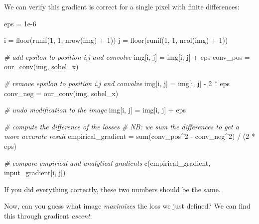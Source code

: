\documentclass[
  a4paper,
]{article}
\newenvironment{Shaded}{\begin{snugshade}}{\end{snugshade}}
\newcommand{\CommentTok}[1]{\textcolor[rgb]{0.56,0.35,0.01}{\textit{#1}}}
\newcommand{\DecValTok}[1]{\textcolor[rgb]{0.00,0.00,0.81}{#1}}
\newcommand{\FloatTok}[1]{\textcolor[rgb]{0.00,0.00,0.81}{#1}}
\newcommand{\FunctionTok}[1]{\textcolor[rgb]{0.00,0.00,0.00}{#1}}
\newcommand{\NormalTok}[1]{#1}
\newcommand{\OtherTok}[1]{\textcolor[rgb]{0.56,0.35,0.01}{#1}}
\newcommand{\SpecialCharTok}[1]{\textcolor[rgb]{0.00,0.00,0.00}{#1}}
\begin{document}
We can verify this gradient is correct for a single pixel with finite
differences:

\begin{Shaded}
\begin{Highlighting}[]
\NormalTok{eps }\OtherTok{=} \FloatTok{1e{-}6}

\NormalTok{i }\OtherTok{=} \FunctionTok{floor}\NormalTok{(}\FunctionTok{runif}\NormalTok{(}\DecValTok{1}\NormalTok{, }\DecValTok{1}\NormalTok{, }\FunctionTok{nrow}\NormalTok{(img) }\SpecialCharTok{+} \DecValTok{1}\NormalTok{))}
\NormalTok{j }\OtherTok{=} \FunctionTok{floor}\NormalTok{(}\FunctionTok{runif}\NormalTok{(}\DecValTok{1}\NormalTok{, }\DecValTok{1}\NormalTok{, }\FunctionTok{ncol}\NormalTok{(img) }\SpecialCharTok{+} \DecValTok{1}\NormalTok{))}

\CommentTok{\# add epsilon to position i,j and convolve}
\NormalTok{img[i, j] }\OtherTok{=}\NormalTok{ img[i, j] }\SpecialCharTok{+}\NormalTok{ eps}
\NormalTok{conv\_pos }\OtherTok{=} \FunctionTok{our\_conv}\NormalTok{(img, sobel\_x)}

\CommentTok{\# remove epsilon to position i,j and convolve}
\NormalTok{img[i, j] }\OtherTok{=}\NormalTok{ img[i, j] }\SpecialCharTok{{-}} \DecValTok{2} \SpecialCharTok{*}\NormalTok{ eps}
\NormalTok{conv\_neg }\OtherTok{=} \FunctionTok{our\_conv}\NormalTok{(img, sobel\_x)}

\CommentTok{\# undo modification to the image}
\NormalTok{img[i, j] }\OtherTok{=}\NormalTok{ img[i, j] }\SpecialCharTok{+}\NormalTok{ eps}

\CommentTok{\# compute the difference of the losses}
\CommentTok{\# NB: we sum the differences to get a more accurate result}
\NormalTok{empirical\_gradient }\OtherTok{=} \FunctionTok{sum}\NormalTok{(conv\_pos}\SpecialCharTok{\^{}}\DecValTok{2} \SpecialCharTok{{-}}\NormalTok{ conv\_neg}\SpecialCharTok{\^{}}\DecValTok{2}\NormalTok{) }\SpecialCharTok{/}\NormalTok{ (}\DecValTok{2} \SpecialCharTok{*}\NormalTok{ eps)}

\CommentTok{\# compare empirical and analytical gradients }
\FunctionTok{c}\NormalTok{(empirical\_gradient, input\_gradient[i, j])}
\end{Highlighting}
\end{Shaded}

If you did everything correctly, these two numbers should be the same.

Now, can you guess what image \emph{maximizes} the loss we just defined?
We can find this through gradient \emph{ascent}:
\end{document}
